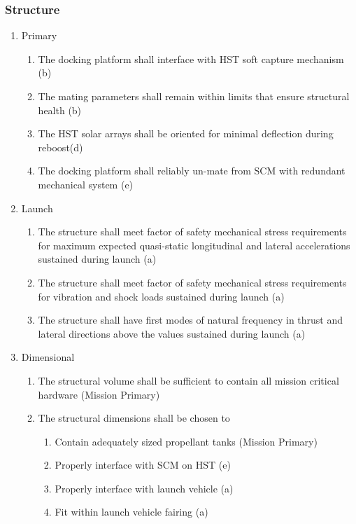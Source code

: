 \documentclass[paper=letter, fontsize=11pt]{scrartcl} %
\numberwithin{equation}{section} %
\numberwithin{figure}{section} %
\numberwithin{table}{section} %
\begin{document}
\subsubsection{Structure}
\begin{enumerate}
\item Primary
\begin{enumerate}
\item The docking platform shall interface with HST soft capture mechanism (b)
\item The mating parameters shall remain within limits that ensure structural health (b)
\item The HST solar arrays shall be oriented for minimal deflection during reboost(d)
\item The docking platform shall reliably un-mate from SCM with redundant mechanical system (e)
\end{enumerate}
\item Launch
\begin{enumerate}
\item The structure shall meet factor of safety mechanical stress requirements for maximum expected quasi-static longitudinal and lateral accelerations sustained during launch (a)
\item The structure shall meet factor of safety mechanical stress requirements for vibration and shock loads sustained during launch (a)
\item The structure shall have first modes of natural frequency in thrust and lateral directions above the values sustained during launch (a)
\end{enumerate}
\item Dimensional
\begin{enumerate}
\item The structural volume shall be sufficient to contain all mission critical hardware (Mission Primary)
\item The structural dimensions shall be chosen to
\begin{enumerate}
\item Contain adequately sized propellant tanks (Mission Primary)
\item Properly interface with SCM on HST (e)
\item Properly interface with launch vehicle (a)
\item Fit within launch vehicle fairing (a)
\end{enumerate}
\end{enumerate}
\end{enumerate}
\end{document}
